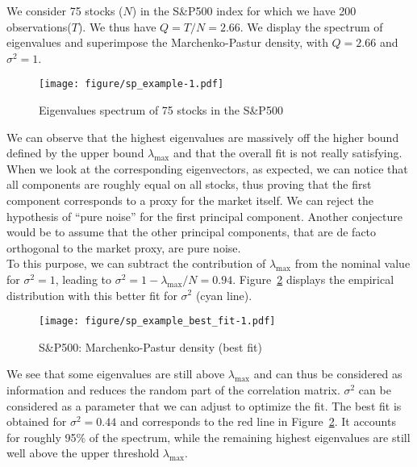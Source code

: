 \begin{examp}
We consider 75 stocks ($N$) in the S\&P500 index for which we have 200 observations($T$). We thus have $Q = T/N = 2.66$. We display the spectrum of eigenvalues and superimpose the Marchenko-Pastur density, with $Q=2.66$ and $\sigma^2=1$.
\end{examp}
\begin{figure}[!ht]
  \centering
  \texttt{[image: figure/sp\_example-1.pdf]}
  \caption{Eigenvalues spectrum of 75 stocks in the S\&P500}
  \label{fig:sp_example-1}
\end{figure}

We can observe that the highest eigenvalues are massively off the higher bound defined by the upper bound $\lambda_{\text{max}}$ and that the overall fit is not really satisfying. \\

When we look at the corresponding eigenvectors, as expected,  we can notice that all components are roughly equal on all stocks, thus proving that the first component corresponds to a proxy for the market itself. We can reject the hypothesis of ``pure noise'' for the first principal component. Another conjecture would be to assume that the other principal components, that are de facto orthogonal to the market proxy, are pure noise.  \\

To this purpose, we can subtract the contribution of $\lambda_{\text{max}}$ from the nominal value for $\sigma^2=1$, leading to $\sigma^2 = 1-\lambda_{\text{max}}/N = 0.94$. Figure~\ref{fig:sp_example_best_fit} displays the empirical distribution with this better fit for $\sigma^2$ (cyan line). 

\begin{figure}[!ht]
  \centering
  \texttt{[image: figure/sp\_example\_best\_fit-1.pdf]}
  \caption{S\&P500: Marchenko-Pastur density (best fit)}
  \label{fig:sp_example_best_fit}
\end{figure}

We see that some eigenvalues are still above $\lambda_{\text{max}}$ and can thus be considered as information and reduces the random part of the correlation matrix. $\sigma^2$ can be considered as a parameter that we can adjust to optimize the fit. The best fit is obtained for $\sigma^2=0.44$ and corresponds to the red line in Figure~\ref{fig:sp_example_best_fit}. It accounts for roughly 95\% of the spectrum, while the remaining highest eigenvalues are still well above the upper threshold $\lambda_{\text{max}}$.  \\


